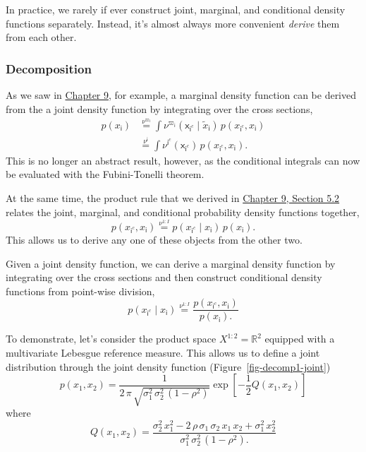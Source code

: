 \documentclass[
  letterpaper,
  DIV=11,
  numbers=noendperiod]{scrartcl}
\begin{document}
In practice, we rarely if ever construct joint, marginal, and
conditional density functions separately. Instead, it's almost always
more convenient \emph{derive} them from each other.

\subsubsection{Decomposition}\label{decomposition}

As we saw in
\href{http://www.symplectomorphic.com/assets/chapters_html/conditional_probability_density_functions.html}{Chapter
9}, for example, a marginal density function can be derived from the a
joint density function by integrating over the cross sections,
\begin{align*}
p( x_{ \mathsf{i} } )
&\overset{ \nu^{\varpi_{\mathsf{i}}} }{=}
\int
\nu^{\varpi_{\mathsf{i}}}(
  \mathsf{x}_{\mathsf{i}^{c}} \mid
  \tilde{x}_{ \mathsf{i} }
) \,
p( x_{\mathsf{i}^{c}}, x_{ \mathsf{i} } )
\\
&\overset{ \nu^{\mathsf{i}} }{=}
\int \nu^{ \mathsf{i}^{c} } ( \mathsf{x}_{\mathsf{i}^{c}} ) \,
p( x_{\mathsf{i}^{c}}, x_{ \mathsf{i} } ).
\end{align*} This is no longer an abstract result, however, as the
conditional integrals can now be evaluated with the Fubini-Tonelli
theorem.

At the same time, the product rule that we derived in
\href{http://www.symplectomorphic.com/assets/chapters_html/conditional_probability_density_functions.html\#the-product-rule}{Chapter
9, Section 5.2} relates the joint, marginal, and conditional probability
density functions together, \[
p( x_{\mathsf{i}^{c}}, x_{ \mathsf{i} } )
\overset{ \nu^{1:I} }{=}
p( x_{\mathsf{i}^{c}} \mid x_{ \mathsf{i} } ) \,
p( x_{ \mathsf{i} } ).
\] This allows us to derive any one of these objects from the other two.

Given a joint density function, we can derive a marginal density
function by integrating over the cross sections and then construct
conditional density functions from point-wise division, \[
p( x_{\mathsf{i}^{c}} \mid x_{ \mathsf{i} } )
\overset{ \nu^{1:I} }{=}
\frac{
  p( x_{\mathsf{i}^{c}}, x_{ \mathsf{i} } )
}{
  p( x_{ \mathsf{i} } ).
}
\]

To demonstrate, let's consider the product space
\(X^{1:2} = \mathbb{R}^{2}\) equipped with a multivariate Lebesgue
reference measure. This allows us to define a joint distribution through
the joint density function (Figure~\ref{fig-decomp1-joint}) \[
p( x_{1}, x_{2} )
=
\frac{
  1
}{
  2 \, \pi \,
  \sqrt{
    \sigma_{1}^{2} \, \sigma_{2}^{2} \, (1 - \rho^{2} )
  }
}
\exp \left[
  -\frac{1}{2} Q( x_{1}, x_{2} )
\right]
\] where \[
Q ( x_{1}, x_{2} )
=
\frac{
    \sigma_{2}^{2} \, x_{1}^{2}
  - 2 \, \rho \, \sigma_{1} \, \sigma_{2} \, x_{1} \, x_{2}
  + \sigma_{1}^{2} \, x_{2}^{2}
}{
  \sigma_{1}^{2} \, \sigma_{2}^{2} \, (1 - \rho^{2} ).
}
\]
\end{document}
